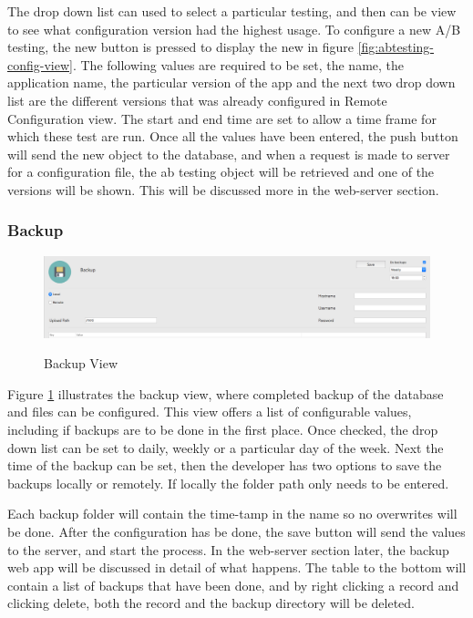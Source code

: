 The drop down list can used to select a particular testing, and then can be view to see what configuration version had the highest usage. To configure a new A/B testing, the new button is pressed to display the new in figure \ref{fig:abtesting-config-view}. The following values are required to be set, the name, the application name, the particular version of the app and the next two drop down list are the different versions that was already configured in Remote Configuration view. The start and end time are set to allow a time frame for which these test are run. Once all the values have been entered, the push button will send the new object to the database, and when a request is made to server for a configuration file, the ab testing object will be retrieved and one of the versions will be shown. This will be discussed more in the web-server section.

\subsubsection{Backup}

\begin{figure}[!h]
    \caption{Backup View}
    \centering
    \includegraphics[width=150mm]{images/dashboard/backup}
    \label{fig:backup-view}
\end{figure} 

Figure \ref{fig:backup-view} illustrates the backup view, where completed backup of the database and files can be configured. This view offers a list of configurable values, including if backups are to be done in the first place. Once checked, the drop down list can be set to daily, weekly or a particular day of the week. Next the time of the backup can be set, then the developer has two options to save the backups locally or remotely. If locally the folder path only needs to be entered. 

Each backup folder will contain the time-tamp in the name so no overwrites will be done. After the configuration has be done, the save button will send the values to the server, and start the process. In the web-server section later, the backup web app will be discussed in detail of what happens. The table to the bottom will contain a list of backups that have been done, and by right clicking a record and clicking delete, both the record and the backup directory will be deleted. 

